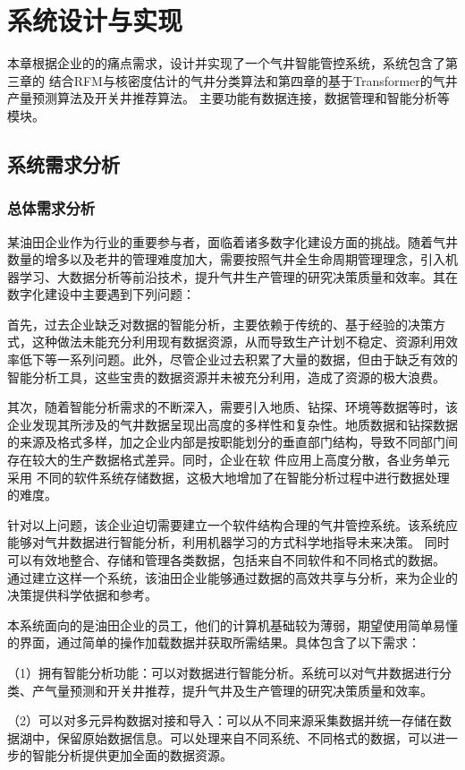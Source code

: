 \chapter{系统设计与实现}
本章根据企业的的痛点需求，设计并实现了一个气井智能管控系统，系统包含了第三章的
结合RFM与核密度估计的气井分类算法和第四章的基于Transformer的气井产量预测算法及开关井推荐算法。
主要功能有数据连接，数据管理和智能分析等模块。
\section{系统需求分析}
\subsection{总体需求分析}
某油田企业作为行业的重要参与者，面临着诸多数字化建设方面的挑战。随着气井数量的增多以及老井的管理难度加大，需要按照气井全生命周期管理理念，引入机器学习、大数据分析等前沿技术，提升气井生产管理的研究决策质量和效率。其在数字化建设中主要遇到下列问题：

首先，过去企业缺乏对数据的智能分析，主要依赖于传统的、基于经验的决策方式，这种做法未能充分利用现有数据资源，从而导致生产计划不稳定、资源利用效率低下等一系列问题。此外，尽管企业过去积累了大量的数据，但由于缺乏有效的智能分析工具，这些宝贵的数据资源并未被充分利用，造成了资源的极大浪费。

其次，随着智能分析需求的不断深入，需要引入地质、钻探、环境等数据等时，该企业发现其所涉及的气井数据呈现出高度的多样性和复杂性。地质数据和钻探数据的来源及格式多样，加之企业内部是按职能划分的垂直部门结构，导致不同部门间存在较大的生产数据格式差异。同时，企业在软
件应用上高度分散，各业务单元采用
不同的软件系统存储数据，这极大地增加了在智能分析过程中进行数据处理的难度。

针对以上问题，该企业迫切需要建立一个软件结构合理的气井管控系统。该系统应能够对气井数据进行智能分析，利用机器学习的方式科学地指导未来决策。
同时可以有效地整合、存储和管理各类数据，包括来自不同软件和不同格式的数据。
通过建立这样一个系统，该油田企业能够通过数据的高效共享与分析，来为企业的决策提供科学依据和参考。

本系统面向的是油田企业的员工，他们的计算机基础较为薄弱，期望使用简单易懂的界面，通过简单的操作加载数据并获取所需结果。具体包含了以下需求：

（1）拥有智能分析功能：可以对数据进行智能分析。系统可以对气井数据进行分类、产气量预测和开关井推荐，提升气井及生产管理的研究决策质量和效率。

（2）可以对多元异构数据对接和导入：可以从不同来源采集数据并统一存储在数据湖中，保留原始数据信息。可以处理来自不同系统、不同格式的数据，可以进一步的智能分析提供更加全面的数据资源。

